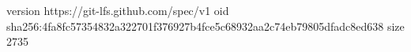 version https://git-lfs.github.com/spec/v1
oid sha256:4fa8fc57354832a322701f376927b4fce5c68932aa2c74eb79805dfadc8ed638
size 2735
